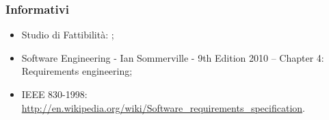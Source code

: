 	\subsubsection{Informativi}
		\begin{itemize}
			\item Studio di Fattibilità: \docNameVersionSdF;
			\item Software Engineering - Ian Sommerville - 9th Edition 2010 – Chapter 4: Requirements engineering;
			\item IEEE 830-1998: \url{http://en.wikipedia.org/wiki/Software_requirements_specification}.
		\end{itemize}
	